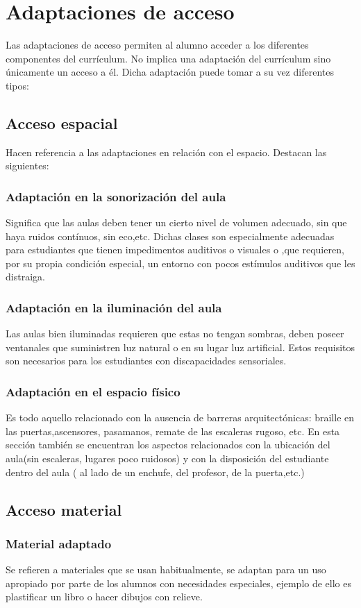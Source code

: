 \section{Adaptaciones de acceso}
Las adaptaciones de acceso permiten al alumno acceder a los diferentes componentes del currículum. No implica una adaptación del currículum sino únicamente un acceso a él. 
Dicha adaptación puede tomar a su vez diferentes tipos:

\subsection{Acceso espacial}
Hacen referencia a las adaptaciones en relación con el espacio. Destacan las siguientes:
\subsubsection{Adaptación en la sonorización del aula}
Significa que las aulas deben tener un cierto nivel de volumen adecuado, sin que haya ruidos contínuos, sin eco,etc. Dichas clases son especialmente adecuadas para estudiantes que tienen impedimentos auditivos o visuales o ,que requieren, por su propia condición especial, un entorno con pocos estímulos auditivos que les distraiga.
\subsubsection{Adaptación en la iluminación del aula}
Las aulas bien iluminadas requieren que estas no tengan sombras, deben poseer ventanales que suministren luz natural o en su lugar luz artificial. Estos requisitos son necesarios para los estudiantes con discapacidades sensoriales.
\subsubsection{Adaptación en el espacio físico}
Es todo aquello relacionado con la ausencia de barreras arquitectónicas:  braille en las puertas,ascensores, pasamanos, remate de las escaleras rugoso, etc. En esta sección también se encuentran los aspectos relacionados con la ubicación del aula(sin escaleras, lugares poco ruidosos) y con la disposición del estudiante dentro del aula ( al lado de un enchufe, del profesor, de la puerta,etc.)

\subsection{Acceso material}
\subsubsection{Material adaptado}
Se refieren a materiales que se usan habitualmente, se adaptan para un uso apropiado por parte de los alumnos con necesidades especiales, ejemplo de ello es plastificar un libro o hacer dibujos con relieve.
